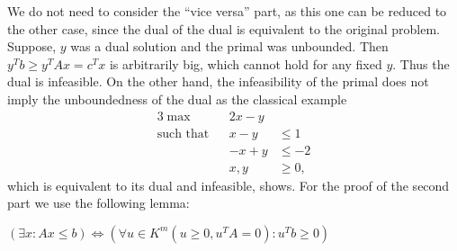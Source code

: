 \documentclass{scrartcl}
\newcommand\1{\mathbf{1}}
\begin{document}
We do not need to consider the \enquote{vice versa} part, as this one can be reduced to the other case, since the dual of the dual is equivalent to the original problem. Suppose, $y$ was a dual solution and the primal was unbounded. Then $y^Tb \ge y^TAx = c^T x$ is arbitrarily big, which cannot hold for any fixed $y$. Thus the dual is infeasible. On the other hand, the infeasibility of the primal does not imply the unboundedness of the dual as the classical example
\begin{alignat*}{3}
\max&& 2x-y \\
\text{such that} && x-y &\le 1 \\
&&-x+y &\le -2 \\
&&x,y &\ge 0,
\end{alignat*}
which is equivalent to its dual and infeasible, shows. For the proof of the second part we use the following lemma:
\begin{Lemma}[Farkas]\label{lem:farkas}
$(\exists x \colon  Ax \le b) \Leftrightarrow (\forall u\in K^m (u\ge 0, u^TA=0)\colon u^Tb \ge 0)$
\end{Lemma}
\end{document}
